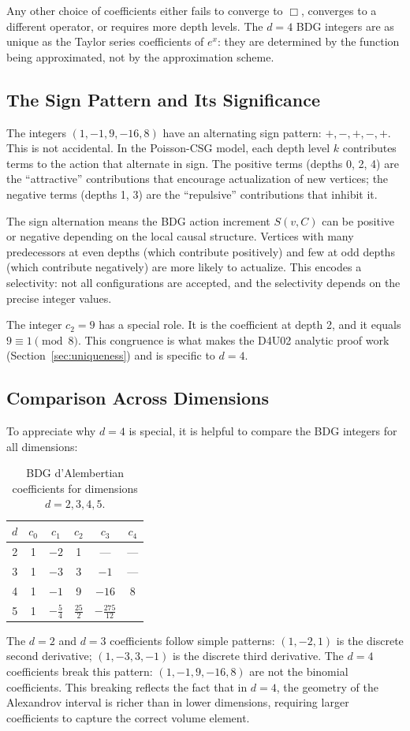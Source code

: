 \documentclass[12pt,a4paper]{article}
\begin{document}
Any other choice of coefficients either fails to converge to $\Box$, converges to a different operator, or requires more depth levels.  The $d=4$ BDG integers are as unique as the Taylor series coefficients of $e^x$: they are determined by the function being approximated, not by the approximation scheme.

\subsection{The Sign Pattern and Its Significance}

The integers $(1,-1,9,-16,8)$ have an alternating sign pattern: $+,-,+,-,+$.  This is not accidental.  In the Poisson-CSG model, each depth level $k$ contributes terms to the action that alternate in sign.  The positive terms (depths 0, 2, 4) are the ``attractive'' contributions that encourage actualization of new vertices; the negative terms (depths 1, 3) are the ``repulsive'' contributions that inhibit it.

The sign alternation means the BDG action increment $S(v,C)$ can be positive or negative depending on the local causal structure.  Vertices with many predecessors at even depths (which contribute positively) and few at odd depths (which contribute negatively) are more likely to actualize.  This encodes a selectivity: not all configurations are accepted, and the selectivity depends on the precise integer values.

The integer $c_2=9$ has a special role.  It is the coefficient at depth 2, and it equals $9\equiv1\pmod8$.  This congruence is what makes the D4U02 analytic proof work (Section~\ref{sec:uniqueness}) and is specific to $d=4$.

\subsection{Comparison Across Dimensions}

To appreciate why $d=4$ is special, it is helpful to compare the BDG integers for all dimensions:
\begin{table}[ht]
\centering
\caption{BDG d'Alembertian coefficients for dimensions $d=2,3,4,5$.}
\label{tab:BDG_dims}
\begin{tabular}{cccccc}
\toprule
$d$ & $c_0$ & $c_1$ & $c_2$ & $c_3$ & $c_4$ \\
\midrule
2 & 1 & $-2$ & 1 & --- & --- \\
3 & 1 & $-3$ & 3 & $-1$ & --- \\
4 & 1 & $-1$ & 9 & $-16$ & 8 \\
5 & 1 & $-\tfrac{5}{4}$ & $\tfrac{25}{2}$ & $-\tfrac{275}{12}$ & \\
\bottomrule
\end{tabular}
\end{table}
The $d=2$ and $d=3$ coefficients follow simple patterns: $(1,-2,1)$ is the discrete second derivative; $(1,-3,3,-1)$ is the discrete third derivative.  The $d=4$ coefficients break this pattern: $(1,-1,9,-16,8)$ are not the binomial coefficients.  This breaking reflects the fact that in $d=4$, the geometry of the Alexandrov interval is richer than in lower dimensions, requiring larger coefficients to capture the correct volume element.
\end{document}

